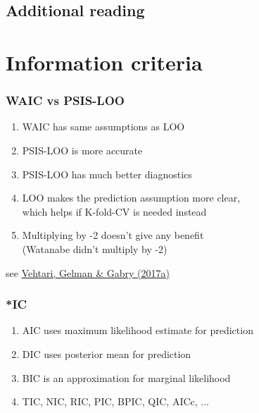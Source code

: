 \documentclass[10pt]{beamer}
\begin{document}
\subsection{Additional reading}


\section{Information criteria}
\frame{\sectionpage}




\begin{frame}{}

\frametitle{ WAIC vs PSIS-LOO}

\begin{enumerate}
  \item<2-> WAIC has same assumptions as LOO
  \item<3-> PSIS-LOO is more accurate
  \item<4-> PSIS-LOO has much better diagnostics
  \item<5-> LOO makes the prediction assumption more clear,\\ which
    helps if K-fold-CV is needed instead
  \item<6-> Multiplying by -2 doesn't give any benefit\\ (Watanabe
    didn't multiply by -2)
\end{enumerate}

\vspace{6\baselineskip}
{\small see \href{http://link.springer.com/article/10.1007/s11222-016-9696-4}{Vehtari, Gelman \& Gabry (2017a)}}
\end{frame}

\begin{frame}{}

\frametitle{ *IC}

\begin{enumerate}
  \item AIC uses maximum likelihood estimate for prediction
  \item DIC uses posterior mean for prediction
  \item BIC is an approximation for marginal likelihood
  \item TIC, NIC, RIC, PIC, BPIC, QIC, AICc, ...
\end{enumerate}

\end{frame}
\end{document}
